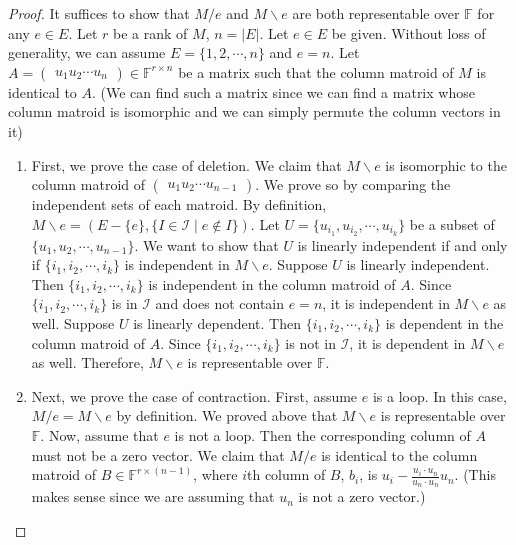 \begin{proof}
It suffices to show that $M / e$ and $M \backslash e$ are both representable over $\mathbb{F}$ for any $e \in E$.
Let $r$ be a rank of $M$, $n = \lvert E \rvert$.
Let $e \in E$ be given.
Without loss of generality, we can assume $E = \{ 1, 2, \cdots, n \}$ and $e = n$.
Let $A = \begin{pmatrix}u_1 u_2 \cdots u_n\end{pmatrix} \in \mathbb{F}^{r \times n}$ be a matrix such that the column matroid of $M$ is identical to $A$.
(We can find such a matrix since we can find a matrix whose column matroid is isomorphic and we can simply permute the column vectors in it)

\begin{enumerate}
\item 
  First, we prove the case of deletion.
  We claim that $M \backslash e$ is isomorphic to the column matroid of $\begin{pmatrix} u_1 u_2 \cdots u_{n-1} \end{pmatrix}$.
  We prove so by comparing the independent sets of each matroid.
  By definition, $M \backslash e = (E - \{ e \}, \{ I \in \mathcal{I} \mid e \notin I \})$.
  Let $U = \{ u_{i_1}, u_{i_2}, \cdots, u_{i_k} \}$ be a subset of $\{ u_1, u_2, \cdots, u_{n-1} \}$.
  We want to show that $U$ is linearly independent if and only if $\{ i_1, i_2, \cdots, i_k \}$ is independent in $M \backslash e$.
  Suppose $U$ is linearly independent. 
  Then $\{ i_1, i_2, \cdots, i_k \}$ is independent in the column matroid of $A$.
  Since $\{ i_1, i_2, \cdots, i_k \}$ is in $\mathcal{I}$ and does not contain $e = n$, it is independent in $M \backslash e$ as well.
  Suppose $U$ is linearly dependent. 
  Then $\{ i_1, i_2, \cdots, i_k \}$ is dependent in the column matroid of $A$.
  Since $\{ i_1, i_2, \cdots, i_k \}$ is not in $\mathcal{I}$, it is dependent in $M \backslash e$ as well.
  Therefore, $M \backslash e$ is representable over $\mathbb{F}$.
\item
  Next, we prove the case of contraction.
  First, assume $e$ is a loop.
  In this case, $M / e = M \backslash e$ by definition.
  We proved above that $M \backslash e$ is representable over $\mathbb{F}$.
  Now, assume that $e$ is not a loop.
  Then the corresponding column of $A$ must not be a zero vector.
  We claim that $M / e$ is identical to the column matroid of $B \in \mathbb{F}^{r \times (n-1)}$, 
  where $i$th column of $B$, $b_i$, is $\displaystyle u_i - \frac{u_i \cdot u_n}{u_n \cdot u_n} u_n$.
  (This makes sense since we are assuming that $u_n$ is not a zero vector.)

\end{enumerate}
\end{proof}

